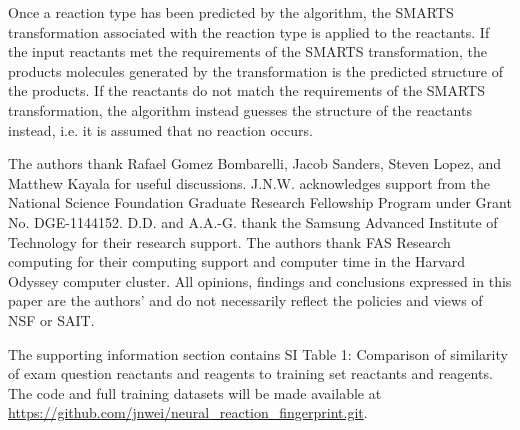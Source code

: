 Once a reaction type has been predicted by the algorithm, the SMARTS transformation associated with the reaction type is applied to the reactants. If the input reactants met the requirements of the SMARTS transformation, the products molecules generated by the transformation is the predicted structure of the products. If the reactants do not match the requirements of the SMARTS transformation, the algorithm instead guesses the structure of the reactants instead, i.e. it is assumed that no reaction occurs. 

\begin{acknowledgement}

The authors thank Rafael Gomez Bombarelli, Jacob Sanders, Steven Lopez, and Matthew Kayala for useful discussions. J.N.W. acknowledges support from the National Science Foundation Graduate Research Fellowship Program under Grant No. DGE-1144152. D.D. and A.A.-G. thank the Samsung Advanced Institute of Technology for their research support. The authors thank FAS Research computing for their computing support and computer time in the Harvard Odyssey computer cluster. All opinions, findings and conclusions expressed in this paper are the authors' and do not necessarily reflect the policies and views of NSF or SAIT.
\end{acknowledgement}

\begin{suppinfo}
The supporting information section contains SI Table 1: Comparison of similarity of exam question reactants and reagents to training set reactants and reagents. The code and full training datasets will be made available at \url{https://github.com/jnwei/neural_reaction_fingerprint.git}.
\end{suppinfo}


